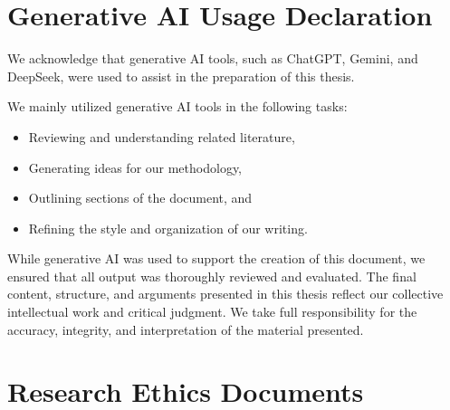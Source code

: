 %
%
%                 
\chapter{Generative AI Usage Declaration}
\label{sec:appendix_genai}

We acknowledge that generative AI tools, such as ChatGPT, Gemini, and DeepSeek, were used to assist in the preparation of this thesis.

We mainly utilized generative AI tools in the following tasks:
\begin{itemize}
	\item Reviewing and understanding related literature,
	\item Generating ideas for our methodology,
	\item Outlining sections of the document, and
	\item Refining the style and organization of our writing.
\end{itemize}

While generative AI was used to support the creation of this document, we ensured that all output was thoroughly reviewed and evaluated. The final content, structure, and arguments presented in this thesis reflect our collective intellectual work and critical judgment. We take full responsibility for the accuracy, integrity, and interpretation of the material presented.

\chapter{Research Ethics Documents}
\label{sec:appendixa}


